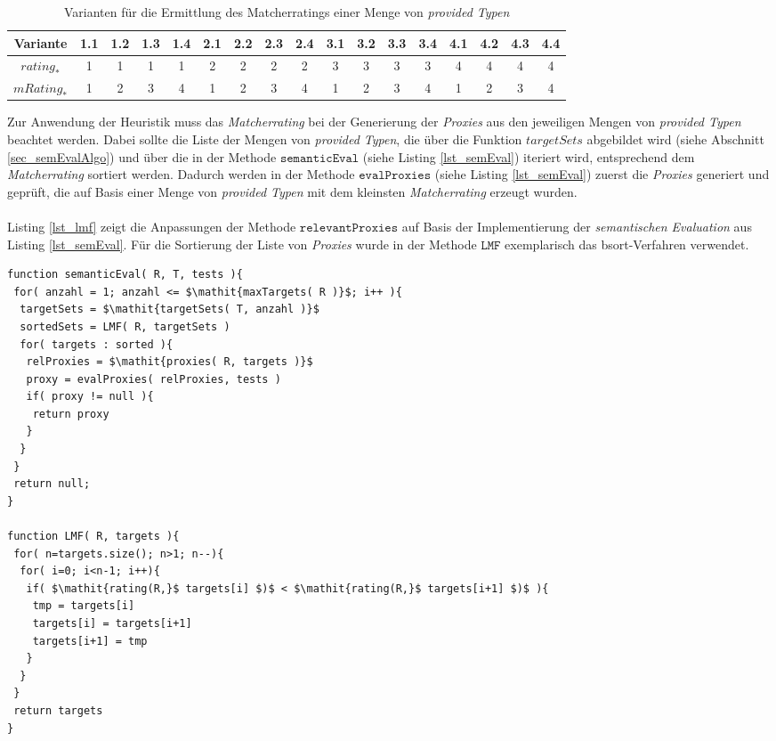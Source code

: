 \begin{table}[h!]
\centering
\small
\begin{tabular}{|c|c|c|c|c|c|c|c|c|c|c|c|c|c|c|c|c|}
\hline
\hline
\textbf{Variante} & 1.1 & 1.2 & 1.3 & 1.4 
& 2.1 & 2.2 & 2.3 & 2.4 
& 3.1 & 3.2 & 3.3 & 3.4 
& 4.1 & 4.2 & 4.3 & 4.4 
\\
\hline
$\mathit{rating}_{*}$& 1 & 1 & 1 & 1
& 2 & 2 & 2 & 2 
& 3 & 3 & 3 & 3 
& 4 & 4 & 4 & 4 
\\
\hline
$\mathit{mRating}_{*}$ & 1 & 2 & 3 & 4 
& 1 & 2 & 3 & 4 
& 1 & 2 & 3 & 4 
& 1 & 2 & 3 & 4 
\\
\hline
\hline
\end{tabular}
\caption{Varianten für die Ermittlung des Matcherratings einer Menge von \emph{provided Typen}}
 \label{tab_matcherratingvarianten}
\end{table}
\noindent
Zur Anwendung der \Gls{Heuristik} muss das \emph{Matcherrating} bei der Generierung der \emph{Proxies} aus den jeweiligen Mengen von \emph{provided Typen} beachtet werden. Dabei sollte die Liste der Mengen von \emph{provided Typen}, die über die Funktion $\mathit{targetSets}$ abgebildet wird (siehe Abschnitt \ref{sec_semEvalAlgo}) und über die in der Methode $\texttt{semanticEval}$ (siehe Listing \ref{lst_semEval}) iteriert wird, entsprechend dem \emph{Matcherrating} sortiert werden. Dadurch werden in der Methode $\texttt{evalProxies}$ (siehe Listing \ref{lst_semEval}) zuerst die \emph{Proxies} generiert und geprüft, die auf Basis einer Menge von \emph{provided Typen} mit dem kleinsten \emph{Matcherrating} erzeugt wurden.
\\\\
Listing \ref{lst_lmf} zeigt die Anpassungen der Methode $\texttt{relevantProxies}$ auf Basis der Implementierung der \emph{semantischen Evaluation} aus Listing \ref{lst_semEval}. Für die Sortierung der Liste von \emph{Proxies} wurde in der Methode $\texttt{LMF}$ exemplarisch das \Gls{bsort}-Verfahren verwendet.

\begin{lstlisting}[style = pseudo, caption=Semantische Evaluation mit Heuristik \emph{LMF}, captionpos=b, label = lst_lmf]
function semanticEval( R, T, tests ){
 for( anzahl = 1; anzahl <= $\mathit{maxTargets( R )}$; i++ ){
  targetSets = $\mathit{targetSets( T, anzahl )}$
  sortedSets = LMF( R, targetSets )		
  for( targets : sorted ){
   relProxies = $\mathit{proxies( R, targets )}$
   proxy = evalProxies( relProxies, tests )	
   if( proxy != null ){
    return proxy
   }
  }
 }
 return null;
}

function LMF( R, targets ){
 for( n=targets.size(); n>1; n--){
  for( i=0; i<n-1; i++){
   if( $\mathit{rating(R,}$ targets[i] $)$ < $\mathit{rating(R,}$ targets[i+1] $)$ ){
    tmp = targets[i]
    targets[i] = targets[i+1]
    targets[i+1] = tmp
   }
  }
 }	
 return targets
}
\end{lstlisting}


